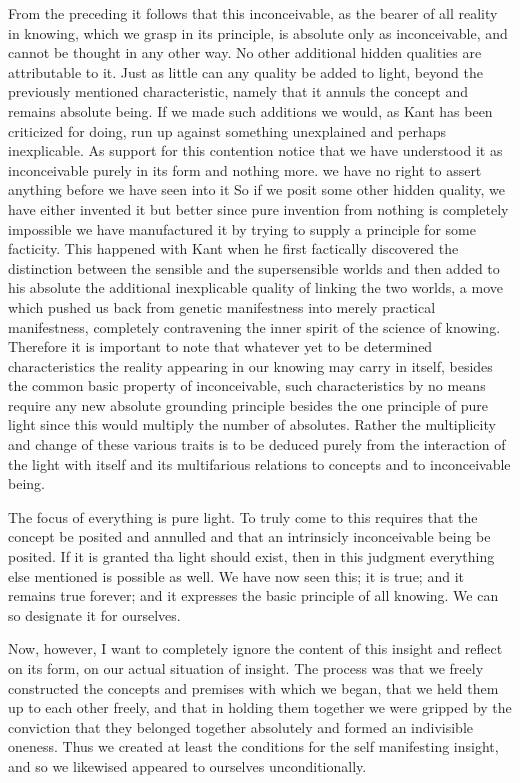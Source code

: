 \documentclass{article}
\begin{document}
\begin{enumerate}
From the preceding it follows that this inconceivable,
as the bearer of all reality in knowing, which we grasp in its principle,
is absolute only as inconceivable, and cannot be thought in any other way.
No other additional hidden qualities are attributable to it.
Just as little can any quality be added to light,
beyond the previously mentioned characteristic,
namely that it annuls the concept and remains absolute being.
If we made such additions we would,
as Kant has been criticized for doing,
run up against something unexplained and perhaps inexplicable.
As support for this contention notice that we have understood it as inconceivable
purely in its form and nothing more.
we have no right to assert anything before we have seen into it
So if we posit some other hidden quality, we have either invented it but
better since pure invention from nothing is completely impossible
we have manufactured it by trying to supply a principle for some facticity.
This happened with Kant when he first factically discovered
the distinction between the sensible and the supersensible worlds
and then added to his absolute the additional inexplicable quality
of linking the two worlds,
a move which pushed us back from genetic manifestness 
into merely practical manifestness,
completely contravening the inner spirit of the science of knowing.
Therefore it is important to note that whatever yet to be determined
characteristics the reality appearing in our knowing may carry in itself,
besides the common basic property of inconceivable,
such characteristics by no means require any new absolute grounding principle
besides the one principle of pure light
since this would multiply the number of absolutes.
Rather the multiplicity and change of these various traits
is to be deduced purely from the interaction of the light with itself
and its multifarious relations to concepts and to inconceivable being.

\end{enumerate}

The focus of everything is pure light.
To truly come to this requires that the concept be posited and annulled
and that an intrinsicly inconceivable being be posited.
If it is granted tha light should exist,
then in this judgment everything else mentioned is possible as well.
We have now seen this; it is true; and it remains true forever;
and it expresses the basic principle of all knowing.
We can so designate it for ourselves.

Now, however, I want to completely ignore the content of this insight
and reflect on its form, on our actual situation of insight.
The process was that we freely constructed the concepts and premises
with which we began, that we held them up to each other freely,
and that in holding them together we were gripped by the conviction
that they belonged together absolutely and formed an indivisible oneness.
Thus we created at least the conditions for the self manifesting insight,
and so we likewised appeared to ourselves unconditionally.
\end{document}
